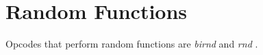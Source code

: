 \begin{comment}
\documentclass[10pt]{article}
\usepackage{fullpage, graphicx, url}
\setlength{\parskip}{1ex}
\setlength{\parindent}{0ex}
\title{Random Functions}



\begin{tabular}{ccc}
The Alternative Csound Reference Manual & & \\
Previous &Mathematical Operations &Next

\end{tabular}

\end{comment}
\section{Random Functions}


  Opcodes that perform random functions are \emph{birnd}
 and \emph{rnd}
. 


\begin{comment}
\begin{tabular}{lcr}
Previous &Home &Next \\
Opcode Equivalents of Functions &Up &Trigonometric Functions

\end{tabular}



\end{comment}
